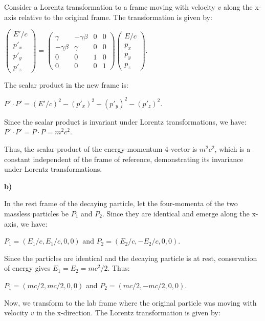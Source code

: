 \documentclass{article}
\begin{document}
Consider a Lorentz transformation to a frame moving with velocity $v$ along the x-axis relative to the original frame. The transformation is given by:

$\begin{pmatrix} E'/c \\ p'_x \\ p'_y \\ p'_z \end{pmatrix} = \begin{pmatrix} \gamma & -\gamma\beta & 0 & 0 \\ -\gamma\beta & \gamma & 0 & 0 \\ 0 & 0 & 1 & 0 \\ 0 & 0 & 0 & 1 \end{pmatrix} \begin{pmatrix} E/c \\ p_x \\ p_y \\ p_z \end{pmatrix}$.

The scalar product in the new frame is:

$P' \cdot P' = (E'/c)^2 - (p'_x)^2 - (p'_y)^2 - (p'_z)^2$.

Since the scalar product is invariant under Lorentz transformations, we have:
$P' \cdot P' = P \cdot P = m^2c^2$.

Thus, the scalar product of the energy-momentum 4-vector is $m^2c^2$, which is a constant independent of the frame of reference, demonstrating its invariance under Lorentz transformations.

\textbf{b)}

In the rest frame of the decaying particle, let the four-momenta of the two massless particles be $P_1$ and $P_2$. Since they are identical and emerge along the x-axis, we have:

$P_1 = (E_1/c, E_1/c, 0, 0)$ and $P_2 = (E_2/c, -E_2/c, 0, 0)$.

Since the particles are identical and the decaying particle is at rest, conservation of energy gives $E_1 = E_2 = mc^2/2$. Thus:

$P_1 = (mc/2, mc/2, 0, 0)$ and $P_2 = (mc/2, -mc/2, 0, 0)$.

Now, we transform to the lab frame where the original particle was moving with velocity $v$ in the x-direction. The Lorentz transformation is given by:
\end{document}
